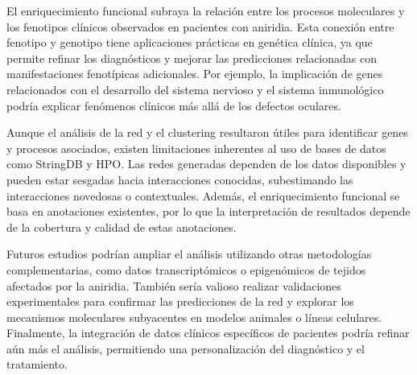 El enriquecimiento funcional subraya la relación entre los procesos moleculares y los fenotipos clínicos observados en pacientes con aniridia. Esta conexión entre fenotipo y genotipo tiene aplicaciones prácticas en genética clínica, ya que permite refinar los diagnósticos y mejorar las predicciones relacionadas con manifestaciones fenotípicas adicionales. Por ejemplo, la implicación de genes relacionados con el desarrollo del sistema nervioso y el sistema inmunológico podría explicar fenómenos clínicos más allá de los defectos oculares.

Aunque el análisis de la red y el clustering resultaron útiles para identificar genes y procesos asociados, existen limitaciones inherentes al uso de bases de datos como StringDB y HPO. Las redes generadas dependen de los datos disponibles y pueden estar sesgadas hacia interacciones conocidas, subestimando las interacciones novedosas o contextuales. Además, el enriquecimiento funcional se basa en anotaciones existentes, por lo que la interpretación de resultados depende de la cobertura y calidad de estas anotaciones.

Futuros estudios podrían ampliar el análisis utilizando otras metodologías complementarias, como datos transcriptómicos o epigenómicos de tejidos afectados por la aniridia. También sería valioso realizar validaciones experimentales para confirmar las predicciones de la red y explorar los mecanismos moleculares subyacentes en modelos animales o líneas celulares. Finalmente, la integración de datos clínicos específicos de pacientes podría refinar aún más el análisis, permitiendo una personalización del diagnóstico y el tratamiento.